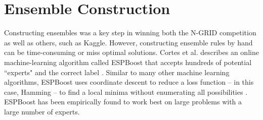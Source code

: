 \section{Ensemble Construction} Constructing ensembles was a key step in winning both the N-GRID competition as well as others, such as Kaggle. However, constructing ensemble rules by hand can be time-consuming or miss optimal solutions. Cortes et al. describes an online machine-learning algorithm called \textsf{ESPBoost} that accepts hundreds of potential ``experts" and the correct label \cite{espboost}. Similar to many other machine learning algorithms, \textsf{ESPBoost} uses coordinate descent to reduce a loss function -- in this case, Hamming -- to find a local minima without enumerating all possibilities \cite{coordinate-descent,hamming-loss}. \textsf{ESPBoost} has been empirically found to work best on large problems with a large number of experts.
 